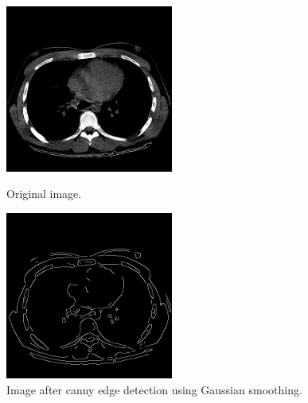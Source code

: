 \documentclass[a4paper,11pt]{article}
\begin{document}
\noindent
\begin{figure}[ht!]
    \begin{minipage}{0.5\textwidth}
        \centering
        \includegraphics[width=55mm]{0020.png}
        \caption{Original image.}
    \end{minipage}\hfill
    \begin{minipage}{0.5\textwidth}
        \centering
        \includegraphics[width=55mm]{0020_canny.png}
        \caption{Image after canny edge detection using Gaussian smoothing.}
    \end{minipage}\hfill
\end{figure}
\end{document}
